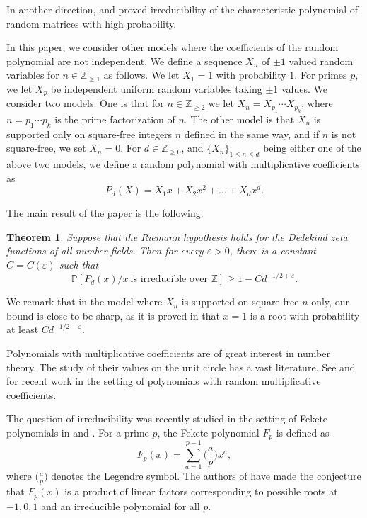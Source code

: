 \documentclass[12pt, notitlepage]{amsart}
\numberwithin{equation}{section}
\def\Z{\mathbb Z}
\def\P{\mathbb P}
\def\ee{\varepsilon}
\newtheorem{theorem}{Theorem}[section]
\theoremstyle{remark}
\theoremstyle{definition}
\theoremstyle{remark}
\numberwithin{equation}{section}
\newcommand{\e}{\varepsilon}
\begin{document}
In another direction, \cite{Ebe} and \cite{FJSS} proved irreducibility of the characteristic polynomial of random matrices with high probability.

In this paper, we consider other models where the coefficients of the random polynomial are not independent.
We define a sequence $X_n$ of $\pm1$ valued random variables for $n\in\Z_{\ge1}$
as follows. We let $X_1=1$ with probability $1$.
For primes $p$, we let $X_p$ be independent uniform random variables taking
$\pm1$ values. We consider two models. One is that for
 $n\in\Z_{\ge 2}$ we let $X_n=X_{p_1}\cdots X_{p_k}$, where
$n=p_1\cdots p_k$ is the prime factorization of $n$.
The other model is that $X_n$ is supported only on square-free integers $n$
defined in the same way,
and if $n$ is not square-free, we set $X_n=0$. 
For $d\in\Z_{\ge 0}$, and $\{X_n\}_{1\le n \le d}$ being either one of the above two models,
we define a random polynomial with multiplicative coefficients as
\[
P_d(X)=X_1x+X_2 x^{2}+\ldots+ X_{d} x^{d}.
\]



The main result of the paper is the following.

\begin{theorem} \label{thm: random}
	Suppose that the Riemann hypothesis holds for the Dedekind zeta functions
	of all number fields.
	Then for every $\e>0$, there is a constant $C=C(\e)$ such that 
	\[\P[P_d(x)/x~\text{is irreducible over $\Z$}  ] \ge 1- C d^{-1/2+\e}. \]
\end{theorem}
We remark that in the model where $X_n$ is supported on square-free $n$ only, our bound is close to be sharp, as it is proved in \cite{AACKX25} that $x=1$ is a root with probability at least $Cd^{-1/2-\ee}$.

Polynomials with multiplicative coefficients are of great interest in number theory.
The study of their values on the unit circle has a vast literature. See \cite{BNR} and \cite{Har} for recent work in the setting of polynomials with
random multiplicative coefficients.

The question of irreducibility was recently studied in the setting of
Fekete polynomials in \cite{MNT23} and \cite{MNT24}.
For a prime $p$, the Fekete polynomial $F_p$ is defined
as
\[
F_p(x)=\sum_{a=1}^{p-1}\Big(\frac{a}{p}\Big) x^a,
\]
where $\big(\frac{a}{p}\big)$ denotes the Legendre symbol.
The authors of \cite{MNT23} have made the conjecture that $F_p(x)$
is a product of linear factors corresponding to possible roots at $-1,0,1$
and an irreducible polynomial for all $p$.
\end{document}
